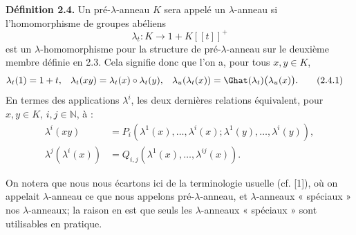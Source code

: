 \documentclass[11pt]{article}
\begin{document}
\textbf{Définition 2.4.} Un pré-\(\lambda\)-anneau \(K\) sera appelé un \(\lambda\)-anneau si l'homomorphisme de groupes abéliens
\[
  \lambda_t:K\longrightarrow1+K[[t]]^+
\]
est un \(\lambda\)-homomorphisme pour la structure de pré-\(\lambda\)-anneau sur le deuxième membre définie en 2.3. Cela signifie donc que l'on a, pour tous \(x,y\in K\),
\begin{align}
  \lambda_t(1)&=1+t,&
  \lambda_t(xy)&=\lambda_t(x)\circ\lambda_t(y),&
  \lambda_u(\lambda_t(x))&=\Ghat(\lambda_t)\bigl(\lambda_u(x)\bigr).
  \tag{2.4.1}
\end{align}
En termes des applications \(\lambda^i\), les deux dernières relations équivalent, pour \(x,y\in K\), \(i,j\in\mathbb N\), à :
\begin{align}
  \lambda^i(xy)
  &=P_i(\lambda^1(x),\ldots,\lambda^i(x);
       \lambda^1(y),\ldots,\lambda^i(y)), \tag{2.4.2}\\
  \lambda^j(\lambda^i(x))
  &=Q_{i,j}(\lambda^1(x),\ldots,\lambda^{ij}(x)). \tag{2.4.3}
\end{align}

On notera que nous nous écartons ici de la terminologie usuelle (cf. [1]), où on appelait \(\lambda\)-anneau ce que nous appelons pré-\(\lambda\)-anneau, et \(\lambda\)-anneaux « spéciaux » nos \(\lambda\)-anneaux; la raison en est que seuls les \(\lambda\)-anneaux « spéciaux » sont utilisables en pratique.
\end{document}
